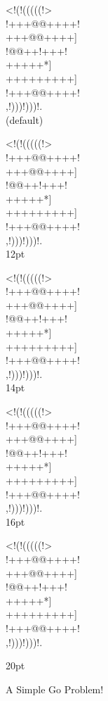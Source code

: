\documentclass[12pt]{article}
\begin{document}
\begin{center}
{\gnos%
<!(!(((((!>\\
!+++@@++++!\\
+++@@++++]\\
!@@++!+++!\\
+++++*]\\
+++++++++]\\
!+++@@++++!\\
,!)))!)))!.\\
}
(default)

{
\gnostwelve%
<!(!(((((!>\\
!+++@@++++!\\
+++@@++++]\\
!@@++!+++!\\
+++++*]\\
+++++++++]\\
!+++@@++++!\\
,!)))!)))!.\\
}
12pt

{
{\gnosfourteen%
<!(!(((((!>\\
!+++@@++++!\\
+++@@++++]\\
!@@++!+++!\\
+++++*]\\
+++++++++]\\
!+++@@++++!\\
,!)))!)))!.\\
}
}
14pt

{
\gnossixteen%
<!(!(((((!>\\
!+++@@++++!\\
+++@@++++]\\
!@@++!+++!\\
+++++*]\\
+++++++++]\\
!+++@@++++!\\
,!)))!)))!.\\
}
16pt

{
\gnostwenty%
<!(!(((((!>\\
!+++@@++++!\\
+++@@++++]\\
!@@++!+++!\\
+++++*]\\
+++++++++]\\
!+++@@++++!\\
,!)))!)))!.\\
\par
}
20pt

A Simple Go Problem!
\end{center}
\end{document}
